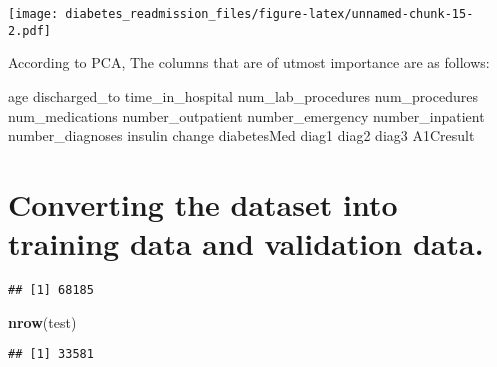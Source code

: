 \documentclass[]{article}
\newenvironment{Shaded}{\begin{snugshade}}{\end{snugshade}}
\newcommand{\KeywordTok}[1]{\textcolor[rgb]{0.13,0.29,0.53}{\textbf{#1}}}
\newcommand{\DataTypeTok}[1]{\textcolor[rgb]{0.13,0.29,0.53}{#1}}
\newcommand{\DecValTok}[1]{\textcolor[rgb]{0.00,0.00,0.81}{#1}}
\newcommand{\StringTok}[1]{\textcolor[rgb]{0.31,0.60,0.02}{#1}}
\newcommand{\OtherTok}[1]{\textcolor[rgb]{0.56,0.35,0.01}{#1}}
\newcommand{\OperatorTok}[1]{\textcolor[rgb]{0.81,0.36,0.00}{\textbf{#1}}}
\newcommand{\NormalTok}[1]{#1}
\begin{document}
\texttt{[image: diabetes\_readmission\_files/figure-latex/unnamed-chunk-15-2.pdf]}

\begin{Shaded}
\end{Shaded}

According to PCA, The columns that are of utmost importance are as
follows:

age discharged\_to time\_in\_hospital num\_lab\_procedures
num\_procedures num\_medications number\_outpatient number\_emergency
number\_inpatient number\_diagnoses insulin change diabetesMed diag1
diag2 diag3 A1Cresult

\section{Converting the dataset into training data and validation
data.}\label{converting-the-dataset-into-training-data-and-validation-data.}

\begin{Shaded}
\end{Shaded}

\begin{verbatim}
## [1] 68185
\end{verbatim}

\begin{Shaded}
\begin{Highlighting}[]
\KeywordTok{nrow}\NormalTok{(test) }
\end{Highlighting}
\end{Shaded}

\begin{verbatim}
## [1] 33581
\end{verbatim}
\end{document}
